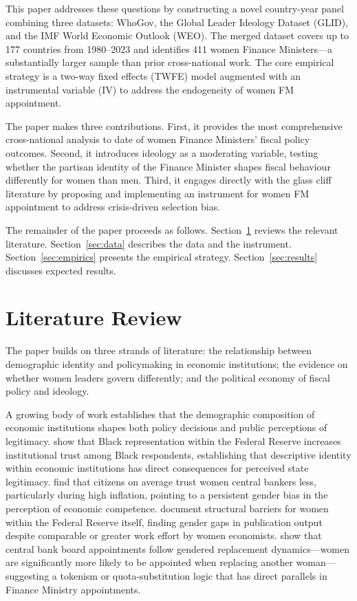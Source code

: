 \documentclass[12pt]{article}
\begin{document}
This paper addresses these questions by constructing a novel country-year panel
combining three datasets: WhoGov, the Global Leader Ideology Dataset (GLID), and
the IMF World Economic Outlook (WEO). The merged dataset covers up to 177
countries from 1980--2023 and identifies 411 women Finance Ministers---a
substantially larger sample than prior cross-national work. The core empirical
strategy is a two-way fixed effects (TWFE) model augmented with an instrumental
variable (IV) to address the endogeneity of women FM appointment.

The paper makes three contributions. First, it provides the most comprehensive
cross-national analysis to date of women Finance Ministers' fiscal policy
outcomes. Second, it introduces ideology as a moderating variable, testing
whether the partisan identity of the Finance Minister shapes fiscal behaviour
differently for women than men. Third, it engages directly with the glass cliff
literature \citep{armstrong2024} by proposing and implementing an instrument
for women FM appointment to address crisis-driven selection bias.

The remainder of the paper proceeds as follows. Section~\ref{sec:lit} reviews
the relevant literature. Section~\ref{sec:data} describes the data and the
instrument. Section~\ref{sec:empirics} presents the empirical strategy.
Section~\ref{sec:results} discusses expected results.

\section{Literature Review}
\label{sec:lit}

The paper builds on three strands of literature: the relationship between
demographic identity and policymaking in economic institutions; the evidence
on whether women leaders govern differently; and the political economy of
fiscal policy and ideology.

A growing body of work establishes that the demographic composition of economic
institutions shapes both policy decisions and public perceptions of legitimacy.
\citet{mcdowell2024} show that Black representation within the Federal Reserve
increases institutional trust among Black respondents, establishing that
descriptive identity within economic institutions has direct consequences for
perceived state legitimacy. \citet{bodea2025} find that citizens on average
trust women central bankers less, particularly during high inflation, pointing
to a persistent gender bias in the perception of economic competence.
\citet{dutta2024} document structural barriers for women within the Federal
Reserve itself, finding gender gaps in publication output despite comparable
or greater work effort by women economists. \citet{charlety2016} show that
central bank board appointments follow gendered replacement dynamics---women
are significantly more likely to be appointed when replacing another woman---
suggesting a tokenism or quota-substitution logic that has direct parallels in
Finance Ministry appointments.
\end{document}
